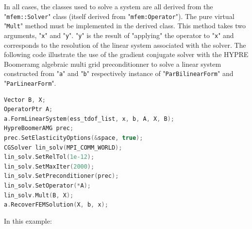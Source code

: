 \documentclass[12pt]{article}
\newcommand{\mycode}[1]{\textsf{"}\lstinline`#1`\textsf{"}}
\begin{document}
In all cases, the classes used to solve a system are all derived from the \mycode{mfem::Solver} class (itself derived from \mycode{mfem:Operator}).
The pure virtual \mycode{Mult} method must be implemented in the derived class. 
This method takes two arguments, \mycode{x} and \mycode{y}.
\mycode{y} is the result of "applying" the operator to \mycode{x} and corresponds to the resolution of the linear  system associated with the solver. 
The following code illustrate the use of the  gradient conjugate solver  with the HYPRE Boomeramg algebraic multi grid preconditionner to solve a linear system constructed from \mycode{a} and \mycode{b} respectively instance of \mycode{ParBilinearForm} and \mycode{ParLinearForm}.
\begin{lstlisting}[basicstyle=\footnotesize,language=c++,label=mfemlin]
Vector B, X;
OperatorPtr A;
a.FormLinearSystem(ess_tdof_list, x, b, A, X, B);
HypreBoomerAMG prec;
prec.SetElasticityOptions(&space, true);
CGSolver lin_solv(MPI_COMM_WORLD);
lin_solv.SetRelTol(1e-12);
lin_solv.SetMaxIter(2000);
lin_solv.SetPreconditioner(prec);
lin_solv.SetOperator(*A);
lin_solv.Mult(B, X);
a.RecoverFEMSolution(X, b, x);
\end{lstlisting}
In this example:
\end{document}
